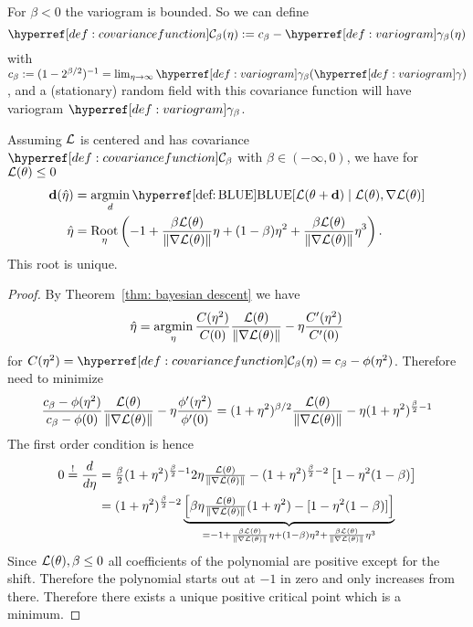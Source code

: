 For \(\beta<0\) the variogram is bounded. So we can define
\[
	\C_\beta(\lr) := c_\beta - \variogram_\beta(\lr)
\]
with \(c_\beta := (1-2^{\beta/2})^{-1} =
\lim_{\lr\to\infty}\variogram_\beta(\variogram)\), and a (stationary) random
field with this covariance function will have variogram \(\variogram_\beta\).

\begin{theorem}[Stationary]
	Assuming \(\mathcal{L}\) is centered and has covariance \(\C_\beta\) with
	\(\beta\in(-\infty, 0)\), we have for \(\mathcal{L}(\theta)\le 0\)
	\begin{align*}
		\step(\hat{\lr})
		&= \argmin_{d}
		\BLUE[\Loss(\param + \step) \mid \Loss(\param), \grad\Loss(\param)]\\
		\hat{\lr}
		&= \Root_\lr\left(
			-1 + \frac{\beta\Loss(\param)}{\|\grad\Loss(\param)\|}\lr
			+(1-\beta)\lr^2 + \frac{\beta\Loss(\param)}{\|\grad\Loss(\param)\|}\lr^3
		\right).
	\end{align*}
	This root is unique.
\end{theorem}

\begin{proof}
	By Theorem~\ref{thm: bayesian descent}	we have
	\begin{equation*}
		\hat{\eta}	
		= \operatorname*{argmin}_{\eta}\frac{C(\eta^2)}{C(0)} \frac{\mathcal{L}(\theta)}{\|\nabla\mathcal{L}(\theta)\|}
		-  \eta\frac{C'(\eta^2)}{C'(0)}
	\end{equation*}
	for \(\sqC(\lr^2) = \C_\beta(\lr) = c_\beta - \phi(\lr^2)\). Therefore need
	to minimize
	\begin{equation*}
		\frac{c_\beta - \phi(\eta^2)}{c_\beta - \phi(0)}
		\frac{\mathcal{L}(\theta)}{\|\nabla\mathcal{L}(\theta)\|}
		- \eta\frac{\phi'(\eta^2)}{\phi'(0)}
		= (1+\eta^2)^{\beta/2} 
		\frac{\mathcal{L}(\theta)}{\|\nabla\mathcal{L}(\theta)\|}
		- \eta(1+\eta^2)^{\frac\beta2-1}\\
	\end{equation*}
	The first order condition is hence
	\begin{align*}
		0\overset!=\frac{d}{d\eta}
		&= \tfrac\beta2(1+\eta^2)^{\frac\beta2-1}2\eta 
		\tfrac{\mathcal{L}(\theta)}{\|\nabla\mathcal{L}(\theta)\|}
		- (1+\eta^2)^{\frac\beta2 -2} \left[1 - \eta^2(1-\beta)\right]\\
		&= (1+\eta^2)^{\frac\beta2-2}\underbrace{\left[
			\beta\eta\tfrac{\mathcal{L}(\theta)}{\|\nabla\mathcal{L}(\theta)\|}(1+\eta^2)
			- [1-\eta^2(1-\beta)]
		\right]}_{
			= -1 + \frac{\beta\mathcal{L}(\theta)}{\|\nabla\mathcal{L}(\theta)\|}\eta
			+(1-\beta)\eta^2 + \frac{\beta\mathcal{L}(\theta)}{\|\nabla\mathcal{L}(\theta)\|}\eta^3
		}
	\end{align*}
	Since \(\mathcal{L}(\theta), \beta\le0\) all coefficients of the polynomial
	are positive except for the shift. Therefore the polynomial starts out
	at \(-1\) in zero and only increases from there. Therefore there exists
	a unique positive critical point which is a minimum.
\end{proof}
